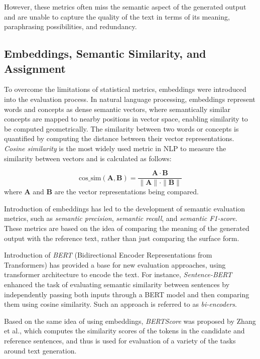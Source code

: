 However, these metrics often miss the semantic aspect of the generated output and are unable to capture the quality of the text in terms of its meaning, paraphrasing possibilities, and redundancy. 

\subsection{Embeddings, Semantic Similarity, and Assignment}

To overcome the limitations of statistical metrics, embeddings were introduced into the evaluation process. 
In natural language processing, embeddings represent words and concepts as dense semantic vectors, where semantically similar concepts are mapped to nearby positions in vector space, enabling similarity to be computed geometrically. 
The similarity between two words or concepts is quantified by computing the distance between their vector representations. 
\textit{Cosine similarity} is the most widely used metric in NLP to measure the similarity between vectors and is calculated as follows:

\[\text{cos\_sim}(\mathbf{A}, \mathbf{B}) = \frac{\mathbf{A} \cdot \mathbf{B}}{\|\mathbf{A}\| \cdot \|\mathbf{B}\|}\]
where $\mathbf{A}$ and $\mathbf{B}$ are the vector representations being compared.

Introduction of embeddings has led to the development of semantic evaluation metrics, such as \textit{semantic precision}, \textit{semantic recall}, and \textit{semantic F1-score}. 
These metrics are based on the idea of comparing the meaning of the generated output with the reference text, rather than just comparing the surface form.

Introduction of \textit{BERT} (Bidirectional Encoder Representations from Transformers)\cite{devlinBERTPretrainingDeep2019} has provided a base for new evaluation approaches, using transformer architecture to encode the text. 
For instance, \textit{Sentence-BERT} enhanced the task of evaluating semantic similarity between sentences\cite{reimersSentenceBERTSentenceEmbeddings2019a} by independently passing both inputs through a BERT model and then comparing them using cosine similarity.
Such an approach is referred to as \textit{bi-encoders}.

Based on the same idea of using embeddings, \textit{BERTScore} was proposed by Zhang et al.\cite{zhangBERTScoreEvaluatingText2020}, which computes the similarity scores of the tokens in the candidate and reference sentences, and thus is used for evaluation of a variety of the tasks around text generation.


